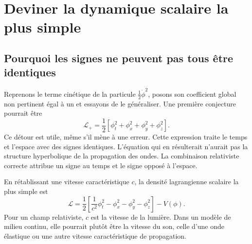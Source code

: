 \section{Deviner la dynamique scalaire la plus simple}

\subsection{Pourquoi les signes ne peuvent pas tous être identiques}

Reprenons le terme cinétique de la particule \(\tfrac12\dot\phi^2\), posons son coefficient global non pertinent égal à un et essayons de le généraliser. Une première conjecture pourrait être
\begin{equation}
\mathcal{L}_{+}
=
\frac12
\left[
\phi_t^2+\phi_x^2+\phi_y^2+\phi_z^2
\right].
\label{eq:sr4-all-plus}
\end{equation}
Ce détour est utile, même s’il mène à une erreur. Cette expression traite le temps et l’espace avec des signes identiques. L’équation qui en résulterait n’aurait pas la structure hyperbolique de la propagation des ondes. La combinaison relativiste correcte attribue un signe au temps et le signe opposé à l’espace.

\begin{classroomqa}
\end{classroomqa}

En rétablissant une vitesse caractéristique \(c\), la densité lagrangienne scalaire la plus simple est
\begin{equation}
\boxed{
\mathcal{L}
=
\frac12
\left[
\frac{1}{c^2}\phi_t^2
-\phi_x^2-\phi_y^2-\phi_z^2
\right]
-V(\phi)
}.
\label{eq:sr4-scalar-lagrangian}
\end{equation}
Pour un champ relativiste, \(c\) est la vitesse de la lumière. Dans un modèle de milieu continu, elle pourrait plutôt être la vitesse du son, celle d’une onde élastique ou une autre vitesse caractéristique de propagation.

